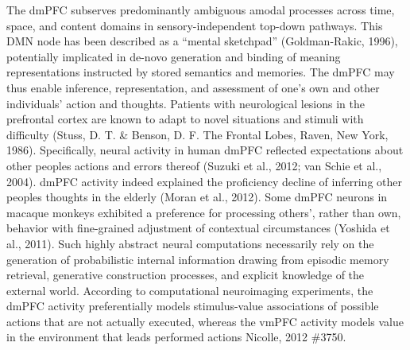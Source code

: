 \documentclass{article} %
\begin{document}
The dmPFC subserves predominantly ambiguous amodal processes
across time, space, and content domains in
sensory-independent top-down pathways.
This DMN node has been described as a “mental sketchpad” (Goldman-Rakic, 1996),
potentially implicated in de-novo generation and binding
of meaning representations instructed by stored semantics and memories.
%
The dmPFC may thus enable inference, representation, and assessment
of one's own and other individuals' action and thoughts.
Patients with neurological lesions in the prefrontal cortex
are known to adapt to novel situations and stimuli with difficulty
(Stuss, D. T. \& Benson, D. F. The Frontal Lobes, Raven, New York, 1986).
Specifically, neural activity in human dmPFC
reflected expectations about other peoples actions and errors thereof
(Suzuki et al., 2012; van Schie et al., 2004).
dmPFC activity indeed explained the proficiency decline
of inferring other peoples thoughts in the elderly (Moran et al., 2012).
Some dmPFC neurons in macaque monkeys exhibited a preference
for processing others', rather than own, behavior
with fine-grained adjustment of contextual circumstances (Yoshida et al., 2011).
%
Such highly abstract neural computations necessarily rely on the
generation of probabilistic internal information drawing from
episodic memory retrieval, generative construction processes,
and explicit knowledge of the external world.
%
According to computational neuroimaging experiments,
the dmPFC activity preferentially models stimulus-value associations of
possible actions that are not actually executed,
whereas the vmPFC activity models value in the environment that leads performed actions
{Nicolle, 2012 \#3750}.
\end{document}
